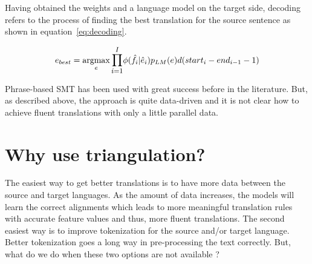 Having obtained the weights and a language model on the target side, decoding refers to the process of finding the best translation for the source sentence as shown in equation~\eqref{eq:decoding}. 

\begin{equation} \label{eq:decoding}
	e_{best} = \argmax_{e} \mathlarger{\prod\limits_{i=1}^I} \phi(\hat{f}_{i} | \hat{e}_{i})p_{LM}(e)d(start_{i} - end_{i-1}-1)
\end{equation}


Phrase-based SMT has been used with great success before in the literature. But, as described above, the approach is quite data-driven and it is not clear how to achieve fluent translations with only a little parallel data.  

\section{Why use triangulation?}

The easiest way to get better translations is to have more data between the source and target languages. As the amount of data increases, the models will learn the correct alignments which leads to more meaningful translation rules with accurate feature values and thus, more fluent translations. The second easiest way is to improve tokenization for the source and/or target language. Better tokenization goes a long way in pre-processing the text correctly. But, what do we do when these two options are not available ? 

\newcommand{\mawuexample}[1]{\emph{$y\grave{a}ng\acute{a}l\acute{a}\grave{a}$ w$\acute{\varepsilon}\acute{\varepsilon}$ $\grave{a}$ $\grave{a}$ l$\acute{a}$kw$\acute{e}$ k$\acute{o}\acute{o}$ b$\acute{\varepsilon}$ m$\grave{a}$ .}}

\newcommand{\anothermawu}[1]{\emph{\textipa{\!d}y$\grave{e}$n\textipa{\textltailn}$\acute{o}$ l$\grave{a}$ $\acute{i}$ kw$\acute{ɔ}$l$\grave{ɔ}$ $\acute{à}n$ d$\grave{a}$$\grave{a}$ l$\grave{u}$ m$\grave{a}$ }}

